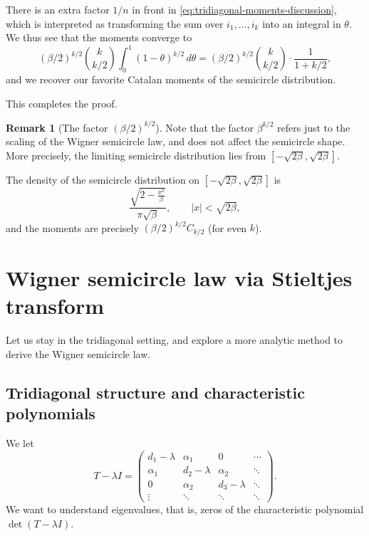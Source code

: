 \documentclass[letterpaper,11pt,oneside,reqno]{article}
\numberwithin{equation}{section}
\theoremstyle{definition}
\newtheorem{remark}[proposition]{Remark}
\begin{document}
There is an extra factor $1/n$ in front in \eqref{eq:tridiagonal-moments-discussion},
which is interpreted as transforming the sum over $i_1,\ldots,i_k $
into an integral in $\theta$. We thus see that the moments converge to
\begin{equation*}
	(\beta/2)^{k/2}\binom{k}{k/2}\int_0^1 (1-\theta)^{k/2} \, d\theta=
	(\beta/2)^{k/2}\binom{k}{k/2}\cdot \frac{1}{1+k/2},
\end{equation*}
and we recover our favorite
Catalan moments of the semicircle distribution.

This completes the proof.

\begin{remark}[The factor $(\beta/2)^{k/2}$]
	Note that the factor $\beta^{k/2}$ refers just to the scaling of the Wigner
	semicircle law, and does not affect the semicircle shape. More precisely,
	the limiting semicircle distribution lies from $[-\sqrt{2\beta},\sqrt{2\beta}]$.

	The density of the semicircle distribution on $[-\sqrt{2\beta},\sqrt{2\beta}]$
	is
	\begin{equation*}
		\frac{\sqrt{2-\frac{x^2}{\beta }}}{\pi  \sqrt{\beta }},\qquad |x|<\sqrt{2\beta},
	\end{equation*}
	and the moments are precisely $(\beta/2)^{k/2}C_{k/2}$ (for even $k$).
\end{remark}

\section{Wigner semicircle law via Stieltjes transform}

Let us stay in the tridiagonal setting, and explore a more analytic
method to derive the Wigner semicircle law.

\subsection{Tridiagonal structure and characteristic polynomials}
\label{sec:tridiag-charpoly}

We let
\[
  T - \lambda I =
  \begin{pmatrix}
    d_1 - \lambda & \alpha_1 & 0 & \cdots \\
    \alpha_1 & d_2 - \lambda & \alpha_2 & \ddots \\
    0 & \alpha_2 & d_3 - \lambda & \ddots \\
    \vdots & \ddots & \ddots & \ddots
  \end{pmatrix}.
\]
We want to understand
eigenvalues, that is,
zeros of the characteristic polynomial
$\det(T - \lambda I)$.
\end{document}
